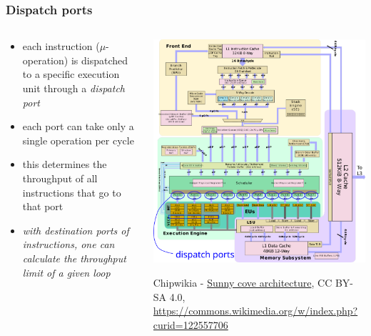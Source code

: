 \documentclass[12pt,dvipdfmx]{beamer}
\newcommand{\ao}[1]{{\color{blue}#1}}
\begin{document}
\begin{frame}[fragile]
\frametitle{Dispatch ports}
\begin{columns}
\begin{column}{0.47\textwidth}
\begin{itemize}
\item each instruction ($\mu$-operation) 
  is dispatched to a specific execution unit through a \ao{\emph{dispatch port}}
\item each port can take only a single operation per cycle
\item this determines the throughput of all instructions
  that go to that port
\item \ao{\it with destination ports of instructions, one can calculate
    the throughput limit of a given loop}
\end{itemize}
\end{column}

\begin{column}{0.56\textwidth}
\includegraphics[width=\textwidth]{out/pdf/svg/icelake.pdf}

{\tiny Chipwikia - \href{https://en.wikipedia.org/wiki/Sunny_Cove_(microarchitecture)}{Sunny cove architecture}, CC BY-SA 4.0, \url{https://commons.wikimedia.org/w/index.php?curid=122557706}}

\end{column}
\end{columns}
\end{frame}
\end{document}
